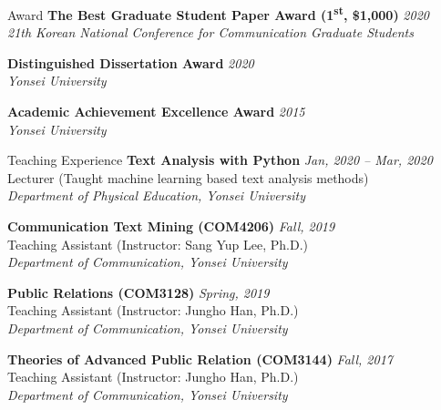 \documentclass{resume} %
\begin{document}

\begin{rSection}{Award}
{\bf The Best Graduate Student Paper Award (1\textsuperscript{st}, \$1,000)} \hfill {\em 2020}\\
{\em 21th Korean National Conference for Communication Graduate Students}

{\bf Distinguished Dissertation Award} \hfill {\em 2020}\\
{\em Yonsei University}

{\bf Academic Achievement Excellence Award} \hfill {\em 2015}\\
{\em Yonsei University}
\end{rSection}


\begin{rSection}{Teaching Experience}
{\bf Text Analysis with Python} \hfill {\em Jan, 2020 -- Mar, 2020}\\
Lecturer (Taught machine learning based text analysis methods)\\
{\em Department of Physical Education, Yonsei University}

{\bf Communication Text Mining (COM4206)} \hfill {\em Fall, 2019}\\
Teaching Assistant (Instructor: Sang Yup Lee, Ph.D.)\\
{\em Department of Communication, Yonsei University}

{\bf Public Relations (COM3128)} \hfill {\em Spring, 2019}\\
Teaching Assistant (Instructor: Jungho Han, Ph.D.)\\
{\em Department of Communication, Yonsei University}

{\bf Theories of Advanced Public Relation (COM3144)} \hfill {\em Fall, 2017}\\
Teaching Assistant (Instructor: Jungho Han, Ph.D.)\\
{\em Department of Communication, Yonsei University}
\end{rSection}

\end{document}
